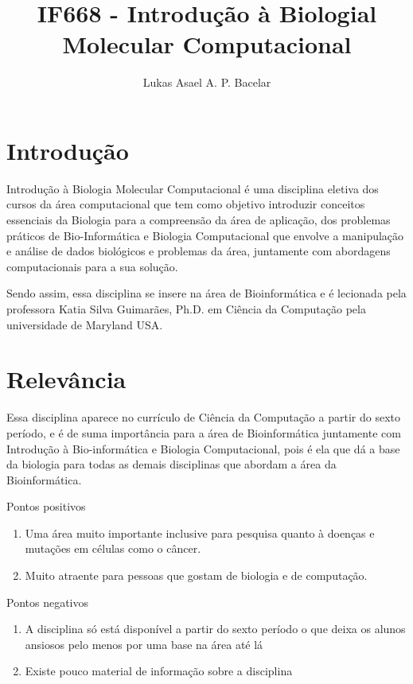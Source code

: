 \documentclass{article}
\title{IF668 - Introdução à Biologial Molecular Computacional}
\author{Lukas Asael A. P. Bacelar }
\begin{document}
\maketitle

\section{Introdução}
Introdução à Biologia Molecular Computacional é uma disciplina eletiva dos cursos da área computacional que tem como objetivo introduzir conceitos essenciais da Biologia para a compreensão da área de aplicação, dos problemas práticos de Bio-Informática e Biologia Computacional que envolve a manipulação e análise de dados biológicos e problemas da área, juntamente com abordagens computacionais para a sua solução.

Sendo assim, essa disciplina se insere na área de Bioinformática e é lecionada pela professora Katia Silva Guimarães, Ph.D. em Ciência da Computação pela universidade de Maryland USA.

\section{Relevância}
Essa disciplina aparece no currículo de Ciência da Computação a partir do sexto período, e é de suma importância para a área de Bioinformática juntamente com Introdução à Bio-informática e Biologia Computacional, pois é ela que dá a base da biologia para todas as demais disciplinas que abordam a área da Bioinformática.

    \item Pontos positivos
      \begin{enumerate}
         \item Uma área muito importante inclusive para pesquisa quanto à doenças e mutações em células como o câncer.
         \item Muito atraente para pessoas que gostam de biologia e de computação.
      \end{enumerate}
    \item Pontos negativos
      \begin{enumerate}
         \item A disciplina só está disponível a partir do sexto período o que deixa os alunos ansiosos pelo menos por uma base na área até lá
         \item Existe pouco material de informação sobre a disciplina
      \end{enumerate}
\end{document}
